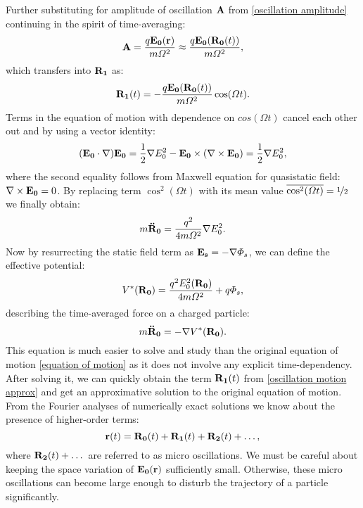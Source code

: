 Further substituting for amplitude of oscillation $\vb{A}$ from \eqref{oscillation amplitude} continuing in the spirit of time-averaging:
\begin{equation}
	\vb{A} = \frac{q \vb{E_0}(\vb{r})}{m \Omega^2} \approx \frac{q \vb{E_0}(\vb{R_0}(t))}{m \Omega^2},
\end{equation}
which transfers into $\vb{R_1}$ as:
\begin{equation}
	\label{oscillation motion approx}
	\vb{R_1}(t) = - \frac{q \vb{E_0}(\vb{R_0}(t))}{m \Omega^2} \cos(\Omega t). 
\end{equation}
Terms in the equation of motion with dependence on $cos(\Omega t)$ cancel each other out and by using a vector identity:
\begin{equation}
	(\vb{E_0} \cdot \nabla) \vb{E_0} = \frac{1}{2} \nabla E_0^2 - \vb{E_0} \times (\nabla \times \vb{E_0}) = \frac{1}{2} \nabla E_0^2,
\end{equation}
where the second equality follows from Maxwell equation for quasistatic field: \\ $\nabla \times \vb{E_0} = 0$. By replacing term $\cos^2(\Omega t)$ with its mean value $\overline{\cos^2(\Omega t)} = \nicefrac{1}{2}$ we finally obtain:
\begin{equation}
	m \vb{\ddot{R}_0} = \frac{q^2}{4 m \Omega^2} \nabla E_0^2.
\end{equation}
Now by resurrecting the static field term as $\vb{E_s} = - \nabla \Phi_s$, we can define the effective potential:
\begin{equation}
	\label{effective potential}
	V^*(\vb{R_0}) = \frac{q^2 E_0^2(\vb{R_0})}{4 m \Omega^2} + q \Phi_s, 
\end{equation}
describing the time-averaged force on a charged particle:
\begin{equation}
	\label{effective equation of motion}
	m \vb{\ddot{R}_0} = - \nabla V^*(\vb{R_0}). 
\end{equation}
This equation is much easier to solve and study than the original equation of motion \eqref{equation of motion} as it does not involve any explicit time-dependency. After solving it, we can quickly obtain the term $\vb{R_1}(t)$ from \eqref{oscillation motion approx} and get an approximative solution to the original equation of motion. From the Fourier analyses of numerically exact solutions \cite{gerlich1992inhomogeneous} we know about the presence of higher-order terms: $$\vb{r}(t) = \vb{R_0}(t) + \vb{R_1}(t) + \vb{R_2}(t) + \dots,$$ where $\vb{R_2}(t) + \dots$ are referred to as micro oscillations. We must be careful about keeping the space variation of $\vb{E_0}(\vb{r})$ sufficiently small. Otherwise, these micro oscillations can become large enough to disturb the trajectory of a particle significantly.

